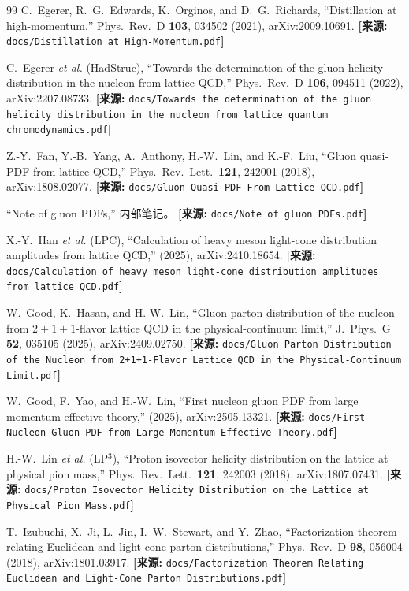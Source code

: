 \documentclass[12pt,a4paper]{ctexart}
\theoremstyle{definition}
\begin{document}
\begin{thebibliography}{99}
C.~Egerer, R.~G.~Edwards, K.~Orginos, and D.~G.~Richards,
``Distillation at high-momentum,''
Phys.\ Rev.\ D \textbf{103}, 034502 (2021), arXiv:2009.10691.
\quad\textbf{[来源:} \texttt{docs/Distillation at High-Momentum.pdf}\textbf{]}

C.~Egerer \textit{et al.} (HadStruc),
``Towards the determination of the gluon helicity distribution in the nucleon from lattice QCD,''
Phys.\ Rev.\ D \textbf{106}, 094511 (2022), arXiv:2207.08733.
\quad\textbf{[来源:} \texttt{docs/Towards the determination of the gluon helicity distribution in the nucleon from lattice quantum chromodynamics.pdf}\textbf{]}

Z.-Y.~Fan, Y.-B.~Yang, A.~Anthony, H.-W.~Lin, and K.-F.~Liu,
``Gluon quasi-PDF from lattice QCD,''
Phys.\ Rev.\ Lett.\ \textbf{121}, 242001 (2018), arXiv:1808.02077.
\quad\textbf{[来源:} \texttt{docs/Gluon Quasi-PDF From Lattice QCD.pdf}\textbf{]}

``Note of gluon PDFs,'' 内部笔记。
\quad\textbf{[来源:} \texttt{docs/Note of gluon PDFs.pdf}\textbf{]}

X.-Y.~Han \textit{et al.} (LPC),
``Calculation of heavy meson light-cone distribution amplitudes from lattice QCD,''
(2025), arXiv:2410.18654.
\quad\textbf{[来源:} \texttt{docs/Calculation of heavy meson light-cone distribution amplitudes from lattice QCD.pdf}\textbf{]}

W.~Good, K.~Hasan, and H.-W.~Lin,
``Gluon parton distribution of the nucleon from $2+1+1$-flavor lattice QCD in the physical-continuum limit,''
J.\ Phys.\ G \textbf{52}, 035105 (2025), arXiv:2409.02750.
\quad\textbf{[来源:} \texttt{docs/Gluon Parton Distribution of the Nucleon from 2+1+1-Flavor Lattice QCD in the Physical-Continuum Limit.pdf}\textbf{]}

W.~Good, F.~Yao, and H.-W.~Lin,
``First nucleon gluon PDF from large momentum effective theory,''
(2025), arXiv:2505.13321.
\quad\textbf{[来源:} \texttt{docs/First Nucleon Gluon PDF from Large Momentum Effective Theory.pdf}\textbf{]}

H.-W.~Lin \textit{et al.} (LP$^3$),
``Proton isovector helicity distribution on the lattice at physical pion mass,''
Phys.\ Rev.\ Lett.\ \textbf{121}, 242003 (2018), arXiv:1807.07431.
\quad\textbf{[来源:} \texttt{docs/Proton Isovector Helicity Distribution on the Lattice at Physical Pion Mass.pdf}\textbf{]}

T.~Izubuchi, X.~Ji, L.~Jin, I.~W.~Stewart, and Y.~Zhao,
``Factorization theorem relating Euclidean and light-cone parton distributions,''
Phys.\ Rev.\ D \textbf{98}, 056004 (2018), arXiv:1801.03917.
\quad\textbf{[来源:} \texttt{docs/Factorization Theorem Relating Euclidean and Light-Cone Parton Distributions.pdf}\textbf{]}

\end{thebibliography}
\end{document}
